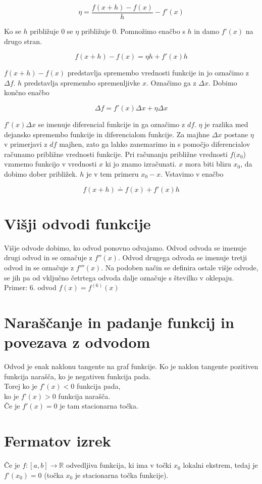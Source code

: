 \documentclass[12pt]{report}
\newcommand{\R}{\mathbb{R}}
\begin{document}
\[\eta=\frac{f(x+h)-f(x)}{h}-f'(x)\] 
 
Ko se $h$ približuje 0 se $\eta$ približuje 0. Pomnožimo enačbo s $h$ in damo $f’(x)$ na drugo stran.

\[f(x+h)-f(x)=\eta h + f'(x)h\] 
 
$f(x+h)-f(x)$ predstavlja spremembo vrednosti funkcije in jo označimo z $\Delta f$. $h$ predstavlja spremembo spremenljivke $x$. Označimo ga z $\Delta x$. Dobimo končno enačbo

\[\Delta f = f'(x)\Delta x+ \eta \Delta x\]
 
$f’(x)\Delta x$ se imenuje diferencial funkcije in ga označimo z $df$. $\eta$ je razlika med dejansko spremembo funkcije in diferencialom funkcije. Za majhne $\Delta x$ postane $\eta$ v primerjavi z $df$ majhen, zato ga lahko zanemarimo in s pomočjo diferencialov računamo približne vrednosti funkcije. Pri računanju približne vrednosti $f(x_0$) vzamemo funkcijo v vrednosti $x$ ki jo znamo izračunati. $x$ mora biti blizu $x_0$, da dobimo dober približek. $h$ je v tem primeru $x_0-x$. Vstavimo v enačbo

\[f(x+h) \doteq f(x)+f'(x)h\]
 

\section*{Višji odvodi funkcije}
Višje odvode dobimo, ko odvod ponovno odvajamo. Odvod odvoda se imenuje drugi odvod in se označuje z $f''(x)$. Odvod drugega odvoda se imenuje tretji odvod in se označuje z $f'''(x)$. Na podoben način se definira ostale višje odvode, se jih pa od vključno četrtega odvoda dalje označuje s številko v oklepaju. \\

Primer: 6. odvod $f(x) = f^{(6)}(x)$

\section*{Naraščanje in padanje funkcij in povezava z odvodom}
Odvod je enak naklonu tangente na graf funkcije. Ko je naklon tangente pozitiven funkcija narašča, ko je negativen funkcija pada. \\
Torej ko je $f’(x)<0$ funkcija pada,\\
 ko je $f’(x)>0$ funkcija narašča.\\
 Če je $f'(x)=0$ je tam stacionarna točka.

\section*{Fermatov izrek}
Če je $f: [a,b] \to \R$ odvedljiva funkcija, ki ima v točki $x_0$ lokalni ekstrem, tedaj je $f’(x_0) = 0$ (točka $x_0$ je stacionarna točka funkcije).
\end{document}
